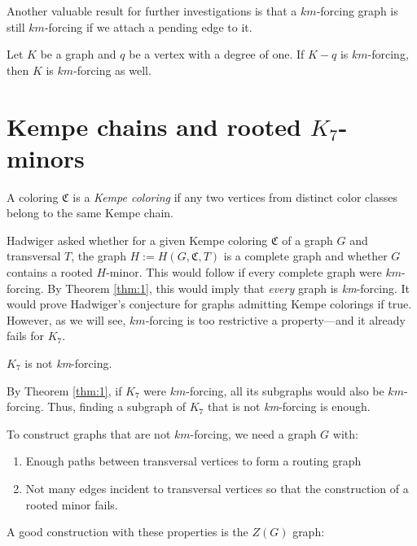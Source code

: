 Another valuable result for further investigations is that a $km$-forcing graph is still $km$-forcing if we attach a pending edge to it.

\begin{thm}
\label{thm:2}
 Let $K$ be a graph and $q$ be a vertex with a degree of one. If $K - q$ is $km$-forcing, then $K$ is $km$-forcing as well.
\end{thm}


\section{Kempe chains and rooted $K_7$-minors}

\begin{defn}
 A coloring $\mathfrak{C}$ is a \textit{Kempe coloring} if any two vertices from distinct color classes belong 
 to the same Kempe chain. 
\end{defn}

Hadwiger \cite{hadwiger_1943} asked whether for a given Kempe coloring $\mathfrak{C}$ of a graph $G$ and transversal $T$, the graph $H:= H(G, \mathfrak{C}, T)$ is a complete graph 
and whether $G$ contains a rooted $H$-minor. This would follow if every complete graph were $km$-forcing. 
By Theorem \ref{thm:1}, this would imply that \textit{every} graph is \textit{km}-forcing. 
It would prove Hadwiger's conjecture for graphs admitting Kempe colorings if true. 
However, as we will see, $km$-forcing is too restrictive a property—and it already fails for $K_7$.

\begin{thm}\label{thm:3}
$K_7$ is not \textit{km}-forcing.
\end{thm}

By Theorem \ref{thm:1}, if $K_7$ were $km$-forcing, all its subgraphs would also be $km$-forcing. Thus, finding a subgraph of $K_7$ that is not \textit{km}-forcing is enough.

To construct graphs that are not $km$-forcing, we need a graph $G$ with:
\begin{enumerate}
\item Enough paths between transversal vertices to form a routing graph
\item Not many edges incident to transversal vertices so that the construction of a rooted minor fails.
\end{enumerate}

A good construction with these properties is the \textit{$Z(G)$} graph:

